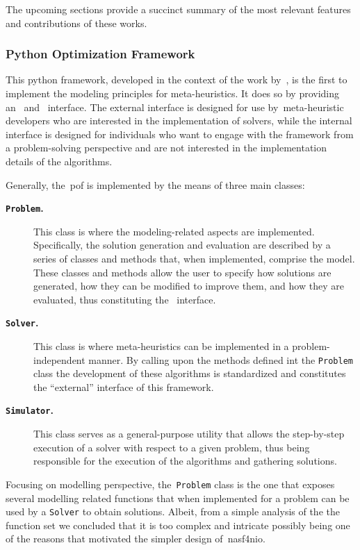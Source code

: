 The upcoming sections provide a succinct summary of the most relevant features
and contributions of these works.

\subsubsection*{Python Optimization Framework}

This python framework, developed in the context of the work
by~\citet{vieira2009uma}, is the first to implement the modeling principles for
meta-heuristics. It does so by providing an~
and~ interface. The external interface is designed for use
by~\acrshort{meta-heuristic} developers who are interested in the implementation
of solvers, while the internal interface is designed for individuals who want to
engage with the framework from a problem-solving perspective and are not
interested in the implementation details of the algorithms.

Generally, the~\acrshort{pof} is implemented by the means of three main classes:

\begin{description}
      \item[\textbf{\texttt{Problem}.}] This class is where the modeling-related
            aspects are implemented. Specifically, the solution generation and
            evaluation are described by a series of classes and methods that, when
            implemented, comprise the model. These classes and methods allow the user
            to specify how solutions are generated, how they can be modified to improve
            them, and how they are evaluated, thus constituting the~ interface.
      \item[\textbf{\texttt{Solver}.}] This class is where meta-heuristics can be implemented in
            a problem-independent manner. By calling upon the methods defined int the \texttt{Problem}
            class the development of these algorithms is standardized and constitutes the ``external''
            interface of this framework.
      \item[\textbf{\texttt{Simulator}.}] This class serves as a
            general-purpose utility that allows the step-by-step execution of a solver
            with respect to a given problem, thus being responsible for the execution
            of the algorithms and gathering solutions.
\end{description}

Focusing on modelling perspective, the~\texttt{Problem} class is the one that
exposes several modelling related functions that when implemented for a problem
can be used by a \texttt{Solver} to obtain solutions. Albeit, from a simple
analysis of the the function set we concluded that it is too complex and
intricate possibly being one of the reasons that motivated the simpler design
of~\acrshort{nasf4nio}.

